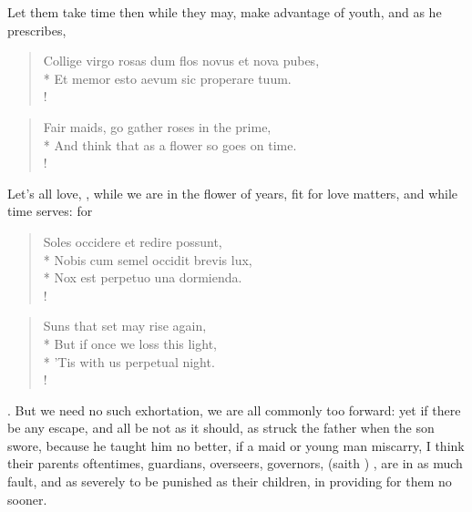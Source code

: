 Let them take time then while they may, make advantage of youth, and as
he prescribes,
%
\begin{latin}
\begin{verse}%
Collige virgo rosas dum flos novus et nova pubes,\\*
Et memor esto aevum sic properare tuum.\\!
\end{verse}%
\end{latin}
\translationrule%
\begin{verse}%
Fair maids, go gather roses in the prime,\\*
And think that as a flower so goes on time.\\!
\end{verse}%
%

Let's all love, , while we are in the flower of
years, fit for love matters, and while time serves: for
%
\begin{latin}
\begin{verse}%
Soles occidere et redire possunt,\\*
Nobis cum semel occidit brevis lux,\\*
Nox est perpetuo una dormienda.\\!
\end{verse}%
\end{latin}
\translationrule%
\begin{verse}
Suns that set may rise again,\\*
But if once we loss this light,\\*
'Tis with us perpetual night.\\!
\end{verse}%
%

. But we need no
such exhortation, we are all commonly too forward: yet if there be any
escape, and all be not as it should, as \Diogenes struck the father when
the son swore, because he taught him no better, if a maid or young man
miscarry, I think their parents oftentimes, guardians, overseers,
governors,  (saith \Chrysostom{}) , \etc{} are in as much fault, and as
severely to be punished as their children, in providing for them no
sooner.


